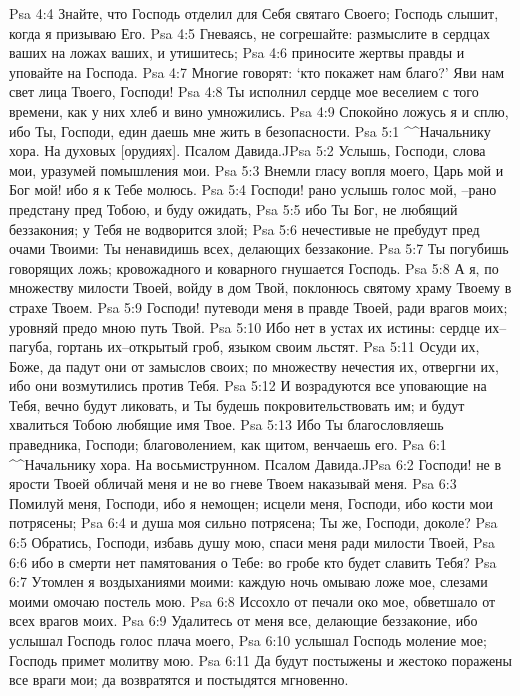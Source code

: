 Psa 4:4  Знайте, что Господь отделил для Себя святаго Своего; Господь слышит, когда я призываю Его.
Psa 4:5  Гневаясь, не согрешайте: размыслите в сердцах ваших на ложах ваших, и утишитесь;
Psa 4:6  приносите жертвы правды и уповайте на Господа.
Psa 4:7  Многие говорят: `кто покажет нам благо?' Яви нам свет лица Твоего, Господи!
Psa 4:8  Ты исполнил сердце мое веселием с того времени, как у них хлеб и вино умножились.
Psa 4:9  Спокойно ложусь я и сплю, ибо Ты, Господи, един даешь мне жить в безопасности.
Psa 5:1  ^^Начальнику хора. На духовых [орудиях]. Псалом Давида.^^
Psa 5:2  Услышь, Господи, слова мои, уразумей помышления мои.
Psa 5:3  Внемли гласу вопля моего, Царь мой и Бог мой! ибо я к Тебе молюсь.
Psa 5:4  Господи! рано услышь голос мой, --рано предстану пред Тобою, и буду ожидать,
Psa 5:5  ибо Ты Бог, не любящий беззакония; у Тебя не водворится злой;
Psa 5:6  нечестивые не пребудут пред очами Твоими: Ты ненавидишь всех, делающих беззаконие.
Psa 5:7  Ты погубишь говорящих ложь; кровожадного и коварного гнушается Господь.
Psa 5:8  А я, по множеству милости Твоей, войду в дом Твой, поклонюсь святому храму Твоему в страхе Твоем.
Psa 5:9  Господи! путеводи меня в правде Твоей, ради врагов моих; уровняй предо мною путь Твой.
Psa 5:10  Ибо нет в устах их истины: сердце их--пагуба, гортань их--открытый гроб, языком своим льстят.
Psa 5:11  Осуди их, Боже, да падут они от замыслов своих; по множеству нечестия их, отвергни их, ибо они возмутились против Тебя.
Psa 5:12  И возрадуются все уповающие на Тебя, вечно будут ликовать, и Ты будешь покровительствовать им; и будут хвалиться Тобою любящие имя Твое.
Psa 5:13  Ибо Ты благословляешь праведника, Господи; благоволением, как щитом, венчаешь его.
Psa 6:1  ^^Начальнику хора. На восьмиструнном. Псалом Давида.^^
Psa 6:2  Господи! не в ярости Твоей обличай меня и не во гневе Твоем наказывай меня.
Psa 6:3  Помилуй меня, Господи, ибо я немощен; исцели меня, Господи, ибо кости мои потрясены;
Psa 6:4  и душа моя сильно потрясена; Ты же, Господи, доколе?
Psa 6:5  Обратись, Господи, избавь душу мою, спаси меня ради милости Твоей,
Psa 6:6  ибо в смерти нет памятования о Тебе: во гробе кто будет славить Тебя?
Psa 6:7  Утомлен я воздыханиями моими: каждую ночь омываю ложе мое, слезами моими омочаю постель мою.
Psa 6:8  Иссохло от печали око мое, обветшало от всех врагов моих.
Psa 6:9  Удалитесь от меня все, делающие беззаконие, ибо услышал Господь голос плача моего,
Psa 6:10  услышал Господь моление мое; Господь примет молитву мою.
Psa 6:11  Да будут постыжены и жестоко поражены все враги мои; да возвратятся и постыдятся мгновенно.
